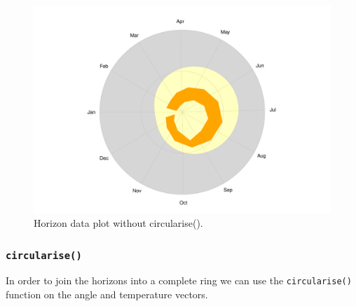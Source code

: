 \documentclass[
]{book}
\begin{document}
\begin{figure}

{\centering \includegraphics[width=0.9\linewidth]{_main_files/figure-latex/lyme-temp-1-1} 

}

\caption{Horizon data plot without circularise().}\label{fig:lyme-temp-1}
\end{figure}

\hypertarget{circularise}{%
\subsubsection{\texorpdfstring{\texttt{circularise()}}{circularise()}}\label{circularise}}

In order to join the horizons into a complete ring we can use the \texttt{circularise()} function on the angle and temperature vectors.
\end{document}

